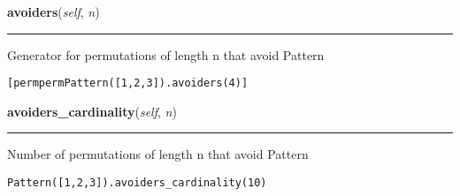 \hspace{.8\funcindent}\begin{boxedminipage}{\funcwidth}

    \raggedright \textbf{avoiders}(\textit{self}, \textit{n})

    \vspace{-1.5ex}

    \rule{\textwidth}{0.5\fboxrule}
\setlength{\parskip}{2ex}
    Generator for permutations of length n that avoid Pattern

\begin{alltt}
\pysrcprompt{{\textgreater}{\textgreater}{\textgreater} }[perm  perm  Pattern([1,2,3]).avoiders(4)]
\pysrcoutput{[[1, 4, 3, 2],}
\pysrcoutput{[2, 1, 4, 3],}
\pysrcoutput{[2, 4, 1, 3],}
\pysrcoutput{[2, 4, 3, 1],}
\pysrcoutput{[3, 1, 4, 2],}
\pysrcoutput{[3, 2, 1, 4],}
\pysrcoutput{[3, 2, 4, 1],}
\pysrcoutput{[3, 4, 1, 2],}
\pysrcoutput{[3, 4, 2, 1],}
\pysrcoutput{[4, 1, 3, 2],}
\pysrcoutput{[4, 2, 1, 3],}
\pysrcoutput{[4, 2, 3, 1],}
\pysrcoutput{[4, 3, 1, 2],}
\pysrcoutput{[4, 3, 2, 1]]}\end{alltt}
\setlength{\parskip}{1ex}
    \end{boxedminipage}

    \label{script-avoids2_spyx:Pattern:avoiders_cardinality}

    \vspace{0.5ex}

\hspace{.8\funcindent}\begin{boxedminipage}{\funcwidth}

    \raggedright \textbf{avoiders\_cardinality}(\textit{self}, \textit{n})

    \vspace{-1.5ex}

    \rule{\textwidth}{0.5\fboxrule}
\setlength{\parskip}{2ex}
    Number of permutations of length n that avoid Pattern

\begin{alltt}
\pysrcprompt{{\textgreater}{\textgreater}{\textgreater} }Pattern([1,2,3]).avoiders\_cardinality(10)
\end{alltt}
\setlength{\parskip}{1ex}
    \end{boxedminipage}

    \label{script-avoids2_spyx:Pattern:avoiders_list}

